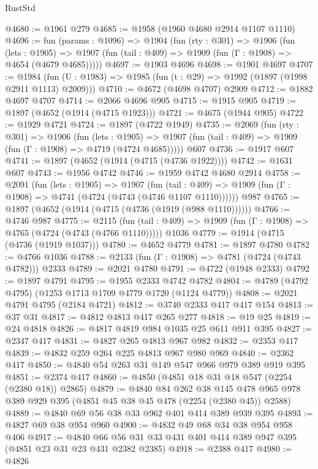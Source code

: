 \begin{lexlean}{RustStd}
\begin{coremodule}
@4680 := @1961 @279
@4685 := @1958 (@1960 @4680 @2914 @1107 @1110)
@4696 := fun (params : @1096) =>
  @1904
    (fun (rty : @301) =>
    @1906
      (fun (lets : @1905) =>
      @1907 (fun (tail : @409) => @1909 (fun (Γ : @1908) => @4654 (@4679 @4685)))))
@4697 := @1903 @4696
@4698 := @1901 @4697
@4707 := @1984 (fun (U : @1983) => @1985 (fun (t : @29) => @1992 (@1897 (@1998 @2911 @1113) @2009)))
@4710 := @4672 (@4698 @4707) @2909
@4712 := @1882 @4697 @4707
@4714 := @2066 @4696 @905
@4715 := @1915 @905
@4719 := @1897 (@4652 (@1914 (@4715 @1923)))
@4721 := @4675 (@1944 @905)
@4722 := @1929 @4721
@4724 := @1897 (@4722 @1949)
@4735 := @2069
    (fun (rty : @301) =>
    @1906
      (fun (lets : @1905) =>
      @1907 (fun (tail : @409) => @1909 (fun (Γ : @1908) => @4719 (@4724 @4685)))))
    @607
@4736 := @1917 @607
@4741 := @1897 (@4652 (@1914 (@4715 (@4736 @1922))))
@4742 := @1631 @607
@4743 := @1956 @4742
@4746 := @1959 @4742 @4680 @2914
@4758 := @2091
    (fun (lets : @1905) =>
    @1907
      (fun (tail : @409) => @1909 (fun (Γ : @1908) => @4741 (@4724 (@4743 (@4746 @1107 @1110))))))
    @987
@4765 := @1897 (@4652 (@1914 (@4715 (@4736 (@1919 (@988 @1110))))))
@4766 := @4746 @987
@4775 := @2115
    (fun (tail : @409) => @1909 (fun (Γ : @1908) => @4765 (@4724 (@4743 (@4766 @1110)))))
    @1036
@4779 := @1914 (@4715 (@4736 (@1919 @1037)))
@4780 := @4652 @4779
@4781 := @1897 @4780
@4782 := @4766 @1036
@4788 := @2133 (fun (Γ : @1908) => @4781 (@4724 (@4743 @4782))) @2333
@4789 := @2021 @4780
@4791 := @4722 (@1948 @2333)
@4792 := @1897 @4791
@4795 := @1955 @2333 @4742 @4782
@4804 := @4789 (@4792 @4795) (@1253 @1713 @1709 @4779 @1720 (@1124 @4779))
@4808 := @2021 @4791 @4795 (@2184 @4721)
@4812 := @3740 @2333 @417 @417 @154
@4813 := @37 @31
@4817 := @4812 @4813 @417 @265 @277
@4818 := @19 @25
@4819 := @24 @4818
@4826 := @4817 @4819 @984 @1035 @25 @611 @911 @395
@4827 := @2347 @417
@4831 := @4827 @265 @4813 @967 @982
@4832 := @2353 @417
@4839 := @4832 @259 @264 @225 @4813 @967 @980 @969
@4840 := @2362 @417
@4850 := @4840 @54 @263 @31 @149 @547 @966 @979 @389 @919 @395
@4851 := @2374 @417
@4860 := @4850 (@4851 @18 @31 @18 @547 (@2254 (@2380 @18)) @2865)
@4879 := @4840
    @84
    @262
    @38
    @145
    @478
    @965
    @978
    @389
    @929
    @395
    (@4851 @45 @38 @45 @478 (@2254 (@2380 @45)) @2588)
@4889 := @4840 @69 @56 @38 @33 @962 @401 @414 @389 @939 @395
@4893 := @4827 @69 @38 @954 @960
@4900 := @4832 @49 @68 @34 @38 @954 @958 @406
@4917 := @4840 @66 @56 @31 @33 @431 @401 @414 @389 @947 @395 (@4851 @23 @31 @23 @431 @2382 @2385)
@4918 := @2388 @417
@4980 := @4826

\end{coremodule}
\end{lexlean}
